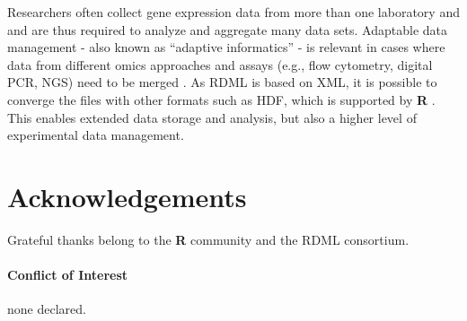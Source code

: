 \documentclass{bioinfo}
\begin{document}
Researchers often collect gene expression data from more than one laboratory and  and are thus required to analyze and aggregate  many data sets. Adaptable data management -  also known as “adaptive 
informatics” - is relevant in cases where data from different omics approaches and  assays (e.g., flow cytometry, digital PCR, NGS) need to be merged 
\cite{baker_quantitative_2012}.  As RDML is based on XML, it is 
possible to converge the files with other formats such as HDF,
\cite{millard_adaptive_2011} which is supported by \textbf{R} \cite{Fischer_HDF5}. This enables extended data storage 
and analysis, but also a higher level of  experimental data management.

\section{Acknowledgements}
Grateful thanks belong to the \textbf{R} community and the RDML consortium.
\paragraph{Conflict of Interest\textcolon} none declared.

%
%
%
%
%
%

%

\end{document}
